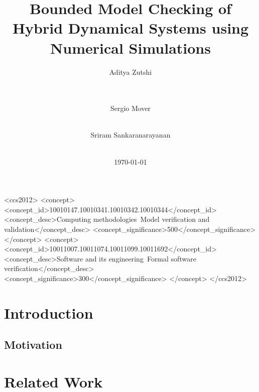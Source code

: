 \documentclass{sig-alternate-05-2015}
\title{Bounded Model Checking of Hybrid Dynamical Systems using Numerical Simulations}
\author{
\alignauthor
Aditya Zutshi\\
\affaddr{\small{University of Colorado, Boulder}}\\
\email{\small{aditya.zutshi@colorado.edu}}\\
    \and
\alignauthor
Sergio Mover\\
\affaddr{\small{University of Colorado, Boulder}}\\
\email{\small{sergio.mover@colorado.edu}}
  \and
\alignauthor
Sriram Sankaranarayanan\\
\affaddr{\small{University of Colorado, Boulder}}\\
\email{\small{srirams@colorado.edu}}
}
\date{\today}
\begin{document}

\maketitle

\begin{abstract}
    
\end{abstract}

%
%
\begin{CCSXML}
<ccs2012>
<concept>
<concept_id>10010147.10010341.10010342.10010344</concept_id>
<concept_desc>Computing methodologies~Model verification and validation</concept_desc>
<concept_significance>500</concept_significance>
</concept>
<concept>
<concept_id>10011007.10011074.10011099.10011692</concept_id>
<concept_desc>Software and its engineering~Formal software verification</concept_desc>
<concept_significance>300</concept_significance>
</concept>
</ccs2012>
\end{CCSXML}


%
%


\newcommand{\RA}[1]{R^{#1}}
\newcommand{\Map}[1]{f_{#1}}

\section{Introduction}
\label{sec:intro}


\subsection{Motivation}
\label{sec:mot}


\section{Related Work}
\label{sec:rel}

\end{document}
